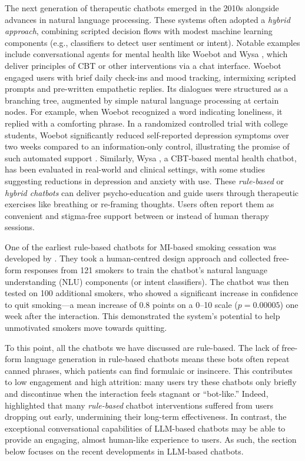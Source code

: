 The next generation of therapeutic chatbots emerged in the 2010s alongside advances in natural language processing. These systems often adopted a \emph{hybrid approach}, combining scripted decision flows with modest machine learning components (e.g., classifiers to detect user sentiment or intent). Notable examples include conversational agents for mental health like Woebot \cite{Fitzpatrick2017} and Wysa \cite{Chang2024}, which deliver principles of CBT or other interventions via a chat interface. Woebot engaged users with brief daily check-ins and mood tracking, intermixing scripted prompts and pre-written empathetic replies. Its dialogues were structured as a branching tree, augmented by simple natural language processing at certain nodes. For example, when Woebot recognized a word indicating loneliness, it replied with a comforting phrase. In a randomized controlled trial with college students, Woebot significantly reduced self-reported depression symptoms over two weeks compared to an information-only control, illustrating the promise of such automated support \cite{Fitzpatrick2017}. Similarly, Wysa \cite{Chang2024}, a CBT-based mental health chatbot, has been evaluated in real-world and clinical settings, with some studies suggesting reductions in depression and anxiety with use. These \emph{rule-based} or \emph{hybrid chatbots} can deliver psycho-education and guide users through therapeutic exercises like breathing or re-framing thoughts. Users often report them as convenient and stigma-free support between or instead of human therapy sessions.

One of the earliest rule-based chatbots for MI-based smoking cessation was developed by \citet{Almusharraf_2019}. They took a human-centred design approach and collected free-form responses from 121 smokers to train the chatbot's natural language understanding (NLU) components (or intent classifiers). The chatbot was then tested on 100 additional smokers, who showed a significant increase in confidence to quit smoking---a mean increase of 0.8 points on a 0–10 scale ($p=0.00005$) one week after the interaction. This demonstrated the system's potential to help unmotivated smokers move towards quitting.

To this point, all the chatbots we have discussed are rule-based. The lack of free-form language generation in rule-based chatbots means these bots often repeat canned phrases, which patients can find formulaic or insincere. This contributes to low engagement and high attrition: many users try these chatbots only briefly and discontinue when the interaction feels stagnant or ``bot-like.'' Indeed, \citet{LIMPANOPPARAT2024100081} highlighted that many \emph{rule-based} chatbot interventions suffered from users dropping out early, undermining their long-term effectiveness. In contrast, the exceptional conversational capabilities of LLM-based chatbots may be able to provide an engaging, almost human-like experience to users. As such, the section below focuses on the recent developments in LLM-based chatbots.


